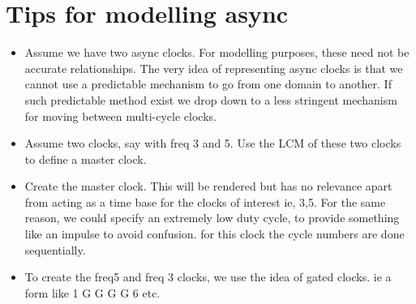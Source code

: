 \documentclass[letterpaper,10pt,english]{sphinxmanual}
\begin{document}
\section{Tips for modelling async}
\label{\detokenize{async:tips-for-modelling-async}}\begin{itemize}
\item {} 
Assume we have two async clocks. For modelling purposes, these need not be
accurate relationships. The very idea of representing async clocks is that we
cannot use a predictable mechanism to go from one domain to another. If such
predictable method exist we drop down to a less stringent mechanism for
moving between multi-cycle clocks.

\item {} 
Assume two clocks, say with freq 3 and 5. Use the LCM of these two clocks to
define a master clock.

\item {} 
Create the master clock. This will be rendered but has no relevance apart
from acting as a time base for the clocks of interest ie, 3,5. For the same
reason, we could specify an extremely low duty cycle, to provide something like
an impulse to avoid confusion. for this clock the cycle numbers are done sequentially.

\item {} 
To create the freq5 and freq 3 clocks, we use the idea of gated clocks. ie a form like
1 G G G G 6 etc.

\end{itemize}
\end{document}
